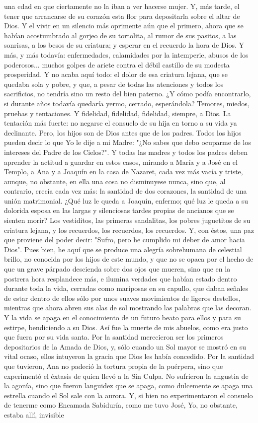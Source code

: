 \documentclass[12pt, twoside, openright]{book} %
\begin{document}
una edad en que ciertamente no la iban a ver hacerse mujer. Y, más tarde, el tener que arrancarse de su corazón esta flor para depositarla sobre el altar de Dios. Y el vivir en un silencio más oprimente aún que el primero, ahora que se habían acostumbrado al gorjeo de su tortolita, al rumor de sus pasitos, a las sonrisas, a los besos de su criatura; y esperar en el recuerdo la hora de Dios. Y más, y más todavía: enfermedades, calamidades por la intemperie, abusos de los poderosos... muchos golpes de ariete contra el débil castillo de su modesta prosperidad. Y no acaba aquí todo: el dolor de esa criatura lejana, que se quedaba sola y pobre, y que, a pesar de todas las atenciones y todos los sacrificios, no tendría sino un resto del bien paterno. ¿Y cómo podía encontrarlo, si durante años todavía quedaría yermo, cerrado, esperándola? Temores, miedos, pruebas y tentaciones. Y fidelidad, fidelidad, fidelidad, siempre, a Dios. La tentación más fuerte: no negarse el consuelo de su hija en torno a su vida ya declinante. Pero, los hijos son de Dios antes que de los padres. Todos los hijos pueden decir lo que Yo le dije a mi Madre: "¿No sabes que debo ocuparme de los intereses del Padre de los Cielos?". Y todas las madres y todos los padres deben aprender la actitud a guardar en estos casos, mirando a María y a José en el Templo, a Ana y a Joaquín en la casa de Nazaret, cada vez más vacía y triste, aunque, no obstante, en ella una cosa no disminuyese nunca, sino que, al contrario, crecía cada vez más: la santidad de dos corazones, la santidad de una unión matrimonial. ¿Qué luz le queda a Joaquín, enfermo; qué luz le queda a su dolorida esposa en las largas y silenciosas tardes propias de ancianos que se sienten morir? Los vestiditos, las primeras sandalitas, los pobres juguetitos de su criatura lejana, y los recuerdos, los recuerdos, los recuerdos. Y, con éstos, una paz que proviene del poder decir: "Sufro, pero he cumplido mi deber de amor hacia Dios". Pues bien, he aquí que se produce una alegría sobrehumana de celestial brillo, no conocida por los hijos de este mundo, y que no se opaca por el hecho de que un grave párpado descienda sobre dos ojos que mueren, sino que en la postrera hora resplandece más, e ilumina verdades que habían estado dentro durante toda la vida, cerradas como mariposas en su capullo, que daban señales de estar dentro de ellos sólo por unos suaves movimientos de ligeros destellos, mientras que ahora abren sus alas de sol mostrando las palabras que las decoran. Y la vida se apaga en el conocimiento de un futuro beato para ellos y para su estirpe, bendiciendo a su Dios. Así fue la muerte de mis abuelos, como era justo que fuera por su vida santa. Por la santidad merecieron ser los primeros depositarios de la Amada de Dios, y, sólo cuando un Sol mayor se mostró en su vital ocaso, ellos intuyeron la gracia que Dios les había concedido. Por la santidad que tuvieron, Ana no padeció la tortura propia de la puérpera, sino que experimentó el éxtasis de quien llevó a la Sin Culpa. No sufrieron la angustia de la agonía, sino que fueron languidez que se apaga, como dulcemente se apaga una estrella cuando el Sol sale con la aurora. Y, si bien no experimentaron el consuelo de tenerme como Encamada Sabiduría, como me tuvo José, Yo, no obstante, estaba allí, invisible 
\end{document}
